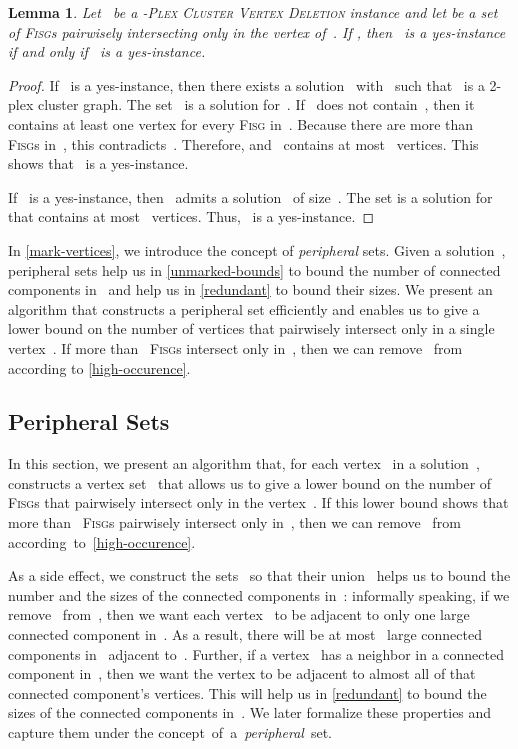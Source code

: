 \documentclass[12pt, a4paper, abstracton]{scrreprt}
\newcommand{\name}{\textsc}
\newcommand{\pvd}[1]{\name{\mbox{-Plex} Cluster Vertex Deletion}}
\newcommand{\FISG}{\textsc{Fisg}}
\newcounter{theorem}
\newtheorem{lemma}{Lemma}[chapter]
\theoremstyle{definition}
\theoremstyle{remark}
\begin{document}
\begin{lemma}\label{high-occurence}
  Let~ be a \pvd 2 instance and let  be a set of \FISG{}s pairwisely intersecting only in the vertex  of~. If , then ~is a yes-instance if and only if ~is a yes-instance.
\end{lemma}

\begin{proof}
  If ~is a yes-instance, then there exists a solution~ with~ such that ~is a 2-plex cluster graph. The set ~is a solution for~.  If~ does not contain~, then it contains at least one vertex for every \FISG{} in~. Because there are more than~ \FISG{}s in~, this contradicts~.  Therefore,  and~ contains at most~ vertices. This shows that~ is a yes-instance.

  If ~is a yes-instance, then ~admits a solution~ of size~.  The set  is a solution for~ that contains at most ~vertices. Thus, ~is a yes-instance.
\end{proof}

\noindent In \autoref{mark-vertices}, we introduce the concept of \emph{peripheral} sets. Given a solution~, peripheral sets help us in \autoref{unmarked-bounds} to bound the number of connected components in~ and help us in \autoref{redundant} to bound their sizes. We present an algorithm that constructs a peripheral set efficiently and enables us to give a lower bound on the number of vertices that pairwisely intersect only in a single vertex~. If more than~ \FISG{}s intersect only in~, then we can remove~ from~ according to \autoref{high-occurence}.

\subsection{Peripheral Sets}\label{mark-vertices}
In this section, we present an algorithm that, for each vertex~ in a solution~, constructs a vertex set~ that allows us to give a lower bound on the number of \FISG{}s that pairwisely intersect only in the vertex~. If this lower bound shows that more than~ \FISG{}s pairwisely intersect only in~, then we can remove~ from~ according~to~\autoref{high-occurence}.

As a side effect, we construct the sets~ so that their union~ helps us to bound the number and the sizes of the connected components in~: informally speaking, if we remove~ from~, then we want each vertex~ to be adjacent to only one large connected component in~. As a result, there will be at most~ large connected components in~ adjacent to~. Further, if a vertex~ has a neighbor in a connected component in~, then we want the vertex  to be adjacent to almost all of that connected component's vertices. This will help us in \autoref{redundant} to bound the sizes of the connected components in~. We later formalize these properties and capture them under the concept~of~a~\emph{peripheral}~set.
\end{document}
